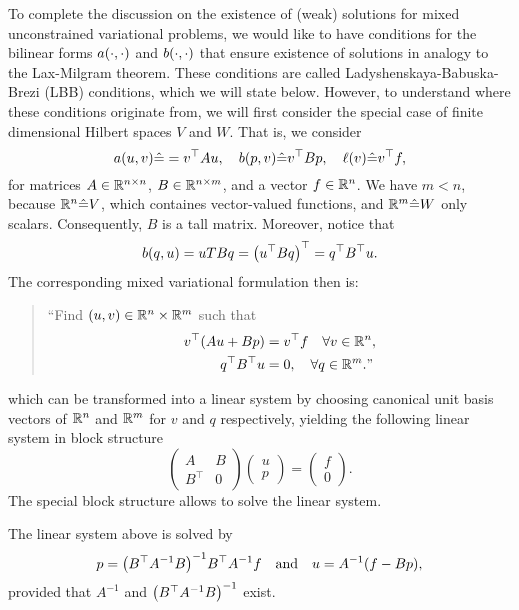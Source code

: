 To complete the discussion on the existence of (weak) solutions for mixed unconstrained variational problems, we would like to have conditions for the bilinear forms \(a\parentheses*{\cdot, \cdot}\) and \(b\parentheses*{\cdot, \cdot}\) that ensure existence of solutions in analogy to the Lax-Milgram theorem.
These conditions are called Ladyshenskaya-Babuska-Brezi (LBB) conditions, which we will state below.
However, to understand where these conditions originate from, we will first consider the special case of finite dimensional Hilbert spaces \(V\) and \(W\).
That is, we consider
\[
	a\parentheses*{u, v} \hat{=} = v^\top Au, \quad b\parentheses*{p, v} \hat{=} v^\top Bp, \quad \ell\parentheses*{v} \hat{=} v^\top f,
\]
for matrices \(A \in \R^{n \times n}\),  \(B \in \R^{n \times m}\), and a vector \(f \in \R^n\).
We have \(m < n\), because \(\R^n \hat{=} V\), which containes vector-valued functions, and \(\R^m \hat{=} W\) only scalars.
Consequently, \(B\) is a tall matrix.
Moreover, notice that
\[
	b\parentheses*{q, u} = uT Bq = \parentheses*{u^\top Bq}^\top = q^\top B^\top u.
\]
The corresponding mixed variational formulation then is:
\begin{quote}
	``Find \(\parentheses*{u, v} \in \R^n \times \R^m\) such that
	\begin{align*}
		v^\top \parentheses*{Au + Bp} &= v^\top f \quad \forall v \in \R^n,\\
		q^\top B^\top u &= 0, \quad \forall q \in \R^m.\text{''}
	\end{align*}
\end{quote}
which can be transformed into a linear system by choosing canonical unit basis vectors of \(\R^n\) and \(\R^m\) for \(v\) and \(q\) respectively, yielding the following linear system in block structure
\[
	\begin{pmatrix}
		A & B\\
		B^\top & 0
	\end{pmatrix}\begin{pmatrix}
		u\\
		p
	\end{pmatrix} = \begin{pmatrix}
		f\\
		0
	\end{pmatrix}.
\]
The special block structure allows to solve the linear system.

\begin{theorem}
	The linear system above is solved by
	\[
		p = \parentheses*{B^\top A^{-1}B}^{-1} B^\top A^{-1} f \quad \text{and} \quad u = A^{-1}\parentheses*{f - Bp},
	\]
	provided that \(A^{-1}\) and \(\parentheses*{B^\top A^{-1}B}^{-1}\) exist.
\end{theorem}

